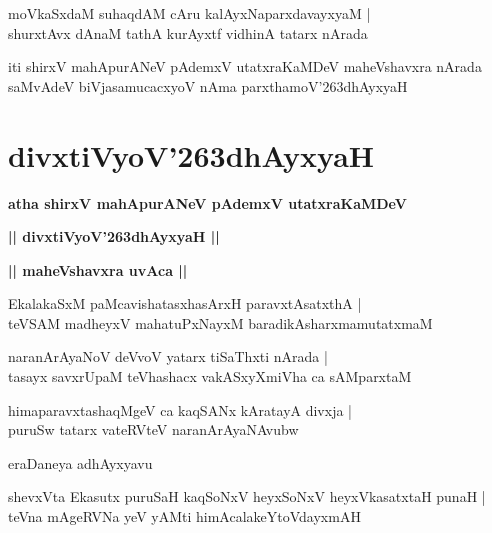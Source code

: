 \documentclass[twoside,12pt,openright]{book}
\def\S{\char'263}
\newcounter{shloka}[chapter]
\def\uvaca#1{\centerline{{\large\textbf{#1}}}}
\begin{document}
\begin{shloka}%
moVkaSxdaM suhaqdAM cAru kalAyxNaparxdavayxyaM |\\
shurxtAvx dAnaM tathA kurAyxtf vidhinA tatarx nArada
\end{shloka}

\begin{center}
iti shirxV mahApurANeV pAdemxV utatxraKaMDeV maheVshavxra nArada saMvAdeV biVjasamucacxyoV nAma parxthamoV\S dhAyxyaH 
\end{center}

\chapter{divxtiVyoV\S dhAyxyaH}


\begin{center}
{\LARGE\bfseries atha shirxV mahApurANeV pAdemxV utatxraKaMDeV}
\end{center}

\begin{center}
{\LARGE\bfseries || divxtiVyoV\S dhAyxyaH ||}
\end{center}


\uvaca{|| maheVshavxra uvAca ||}

\begin{shloka}%
EkalakaSxM paMcavishatasxhasArxH paravxtAsatxthA |\\
teVSAM madheyxV mahatuPxNayxM baradikAsharxmamutatxmaM 
\end{shloka}

\begin{shloka}%
naranArAyaNoV deVvoV yatarx tiSaThxti nArada |\\
tasayx savxrUpaM teVhashacx vakASxyXmiVha ca sAMparxtaM 
\end{shloka}

\begin{shloka}%
himaparavxtashaqMgeV ca kaqSANx kAratayA divxja |\\
puruSw tatarx vateRVteV naranArAyaNAvubw
\end{shloka}

\begin{center}
eraDaneya adhAyxyavu
\end{center}

\begin{shloka}%
shevxVta Ekasutx puruSaH kaqSoNxV heyxSoNxV heyxVkasatxtaH punaH |\\
teVna mAgeRVNa yeV yAMti himAcalakeYtoVdayxmAH 
\end{shloka}
\end{document}
